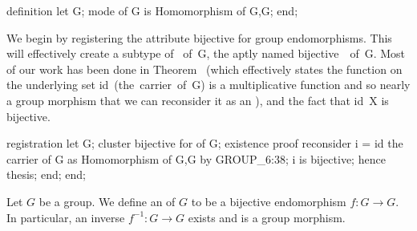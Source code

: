 \nwenddocs{}\endmoddef\nwstartdeflinemarkup{}\nwenddeflinemarkup
definition
  let G;
  mode  of G is Homomorphism of G,G;
end;
\eatline
{}\nwendcode{}\nwdocspar
\begin{registration}\label{par:characteristic:register-bijective-for-endomorphism}
We begin by registering the attribute {\Tt{}bijective\nwendquote} for group
endomorphisms. This will effectively create a subtype of {\Tt{}\ of\ G\nwendquote},
the aptly named {\Tt{}bijective\ \ of\ G\nwendquote}. Most of our work has
been done in Theorem~
(which effectively states the function on the underlying set
{\Tt{}id\ (the\ carrier\ of\ G)\nwendquote} is a multiplicative function and so nearly a
group morphism that we can reconsider it as an {\Tt{}\nwendquote}), and
the fact that {\Tt{}id\ X\nwendquote} is bijective.
\end{registration}

\nwenddocs{}\endmoddef\nwstartdeflinemarkup{}\nwenddeflinemarkup
registration
  let G;
  cluster bijective for  of G;
  existence
  proof
    reconsider i = id the carrier of G as Homomorphism of G,G by GROUP_6:38;
    i is bijective;
    hence thesis;
  end;
end;
\nwendcode{}\nwdocspar

\begin{definition*}
Let $G$ be a group. We define an  of $G$ to be a
bijective endomorphism $f\colon G\to G$. In particular, an inverse
$f^{-1}\colon G\to G$ exists and is a group morphism.
\end{definition*}

